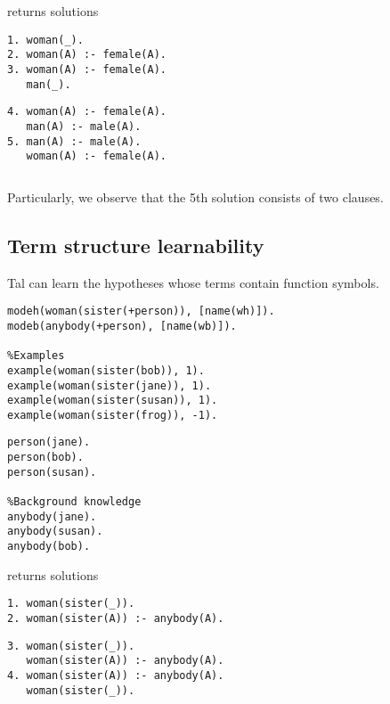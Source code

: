 returns solutions

\begin{minipage}[t]{.50\textwidth}
\begin{lstlisting}
1. woman(_).
2. woman(A) :- female(A).
3. woman(A) :- female(A).
   man(_).
\end{lstlisting}
\end{minipage}
\begin{minipage}[t]{.20\textwidth}
\begin{lstlisting}
4. woman(A) :- female(A).
   man(A) :- male(A).
5. man(A) :- male(A).
   woman(A) :- female(A).
\end{lstlisting}
\end{minipage}

\begin{lstlisting}
\end{lstlisting}

Particularly, we observe that the 5th solution consists of two clauses.

\subsection{Term structure learnability}
Tal can learn the hypotheses whose terms contain function symbols.

\begin{minipage}[t]{.60\textwidth}
\begin{lstlisting}
modeh(woman(sister(+person)), [name(wh)]).
modeb(anybody(+person), [name(wb)]).

%Examples
example(woman(sister(bob)), 1).
example(woman(sister(jane)), 1).
example(woman(sister(susan)), 1).
example(woman(sister(frog)), -1).
\end{lstlisting}
\end{minipage}
\begin{minipage}[t]{.20\textwidth}
\begin{lstlisting}
person(jane).
person(bob).
person(susan).

%Background knowledge
anybody(jane).
anybody(susan).
anybody(bob).
\end{lstlisting}
\end{minipage}

returns solutions

\begin{minipage}[t]{.50\textwidth}
\begin{lstlisting}
1. woman(sister(_)).
2. woman(sister(A)) :- anybody(A).
\end{lstlisting}
\end{minipage}
\begin{minipage}[t]{.20\textwidth}
\begin{lstlisting}
3. woman(sister(_)).
   woman(sister(A)) :- anybody(A).
4. woman(sister(A)) :- anybody(A).
   woman(sister(_)).
\end{lstlisting}
\end{minipage}

